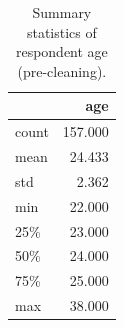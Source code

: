 \begin{table}[htbp]
\caption{Summary statistics of respondent age (pre-cleaning).}
\label{tab:age_summary_precheck}
\begin{tabular}{lr}
\toprule
 & age \\
\midrule
count & 157.000 \\
mean & 24.433 \\
std & 2.362 \\
min & 22.000 \\
25\% & 23.000 \\
50\% & 24.000 \\
75\% & 25.000 \\
max & 38.000 \\
\bottomrule
\end{tabular}
\end{table}

